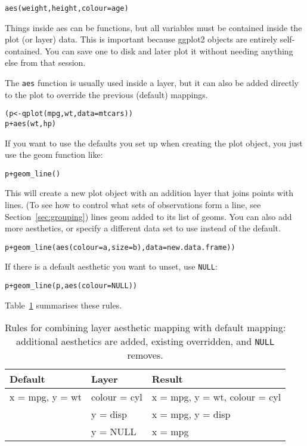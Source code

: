 \begin{alltt}
aes(weight, height, colour = age)
\end{alltt}

Things inside aes can be functions, but all variables must be contained inside the plot (or layer) data.  This is important because ggplot2 objects are entirely self-contained.  You can save one to disk and later plot it without needing anything else from that session.

The {\tt aes} function is usually used inside a layer, but it can also be added directly to the plot to override the previous (default) mappings.  

\begin{alltt}
(p <- qplot(mpg, wt, data=mtcars))
p + aes(wt, hp)
\end{alltt}

If you want to use the defaults you set up when creating the plot object, you just use the geom function like:

\begin{alltt}
p + geom_line()
\end{alltt}

This will create a new plot object with an addition layer that joins points with lines.  (To see how to control what sets of observations form a line, see Section~\ref{sec:grouping}) lines geom added to its list of geoms.   You can also add more aesthetics, or specify a different data set to use instead of the default.  

\begin{alltt}
p + geom_line(aes(colour=a, size=b), data=new.data.frame))
\end{alltt}

If there is a default aesthetic you want to unset, use {\tt NULL}:

\begin{alltt}
p + geom_line(p, aes(colour=NULL))
\end{alltt}

Table~\ref{tbl:aes-override} summarises these rules.

\begin{table}
  \begin{center}
  \begin{tabular}{lll}
    \toprule
    Default & Layer  & Result \\
    \midrule
    x = mpg, y = wt & colour = cyl & x = mpg, y = wt, colour = cyl \\
                    & y = disp & x = mpg, y = disp \\
                    & y = NULL & x = mpg \\
    \bottomrule
  \end{tabular}
  \end{center}
  \caption{Rules for combining layer aesthetic mapping with default mapping:  additional aesthetics are added, existing overridden, and {\tt NULL} removes.}
  \label{tbl:aes-override}
\end{table}

